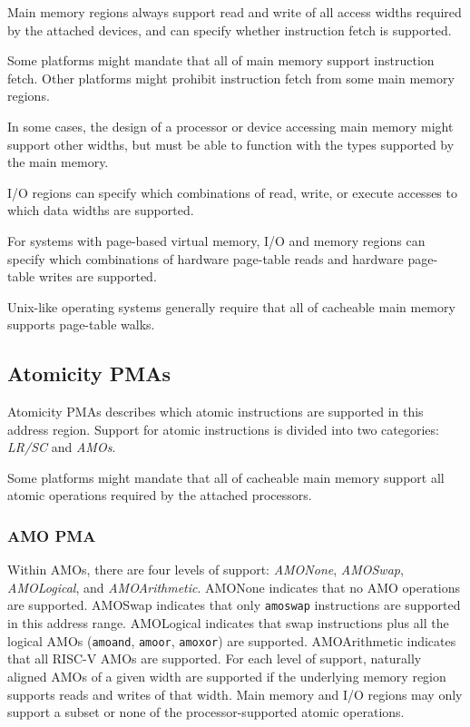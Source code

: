 Main memory regions always support read and write of all
access widths required by the attached devices, and can
specify whether instruction fetch is supported.

\begin{commentary}
Some platforms might mandate that all of main memory support instruction
fetch.
Other platforms might prohibit instruction fetch from some main memory
regions.
\end{commentary}

\begin{commentary}
In some cases, the design of a processor or device accessing main
memory might support other widths, but must be able to function with
the types supported by the main memory.
\end{commentary}

I/O regions can specify which combinations of read, write, or execute
accesses to which data widths are supported.

For systems with page-based virtual memory, I/O and memory regions can
specify which combinations of hardware page-table reads and hardware
page-table writes are supported.

\begin{commentary}
Unix-like operating systems generally require that all of cacheable main
memory supports page-table walks.
\end{commentary}

\subsection{Atomicity PMAs}

Atomicity PMAs describes which atomic instructions are supported in
this address region.
Support for atomic instructions is divided into two
categories: {\em LR/SC} and {\em AMOs}.

\begin{commentary}
Some platforms might mandate that all of cacheable main memory support
all atomic operations required by the attached processors.
\end{commentary}

\subsubsection{AMO PMA}

  Within AMOs, there are four levels of
support: {\em AMONone}, {\em AMOSwap}, {\em AMOLogical}, and {\em
  AMOArithmetic}.  AMONone indicates that no AMO operations are
supported.  AMOSwap indicates that only {\tt amoswap} instructions are
supported in this address range.  AMOLogical indicates that swap
instructions plus all the logical AMOs ({\tt amoand}, {\tt amoor},
{\tt amoxor}) are supported.  AMOArithmetic indicates that all RISC-V
AMOs are supported.  For each level of support, naturally aligned AMOs
of a given width are supported if the underlying memory region
supports reads and writes of that width.
Main memory and I/O regions may only support a subset or none of the
processor-supported atomic operations.


